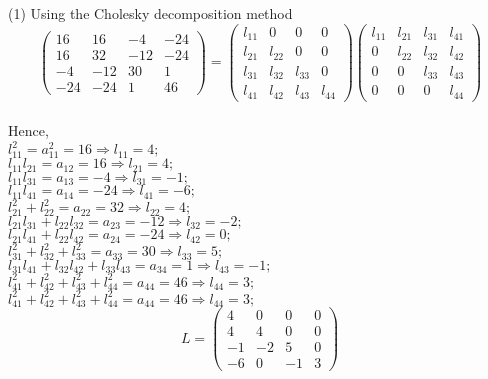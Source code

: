 \documentclass[a4paper, 12pt]{report}
\begin{document}
{      (1) Using the Cholesky decomposition method\\
      \begin{equation*}
      \begin{pmatrix}
      16 & 16 & -4 & -24\\
      16 & 32 & -12 & -24\\
      -4 & -12 & 30 & 1\\
      -24 & -24 & 1 & 46
      \end{pmatrix}
      =
     \begin{pmatrix}
     l_{11} & 0 & 0 & 0\\
     l_{21} & l_{22} & 0 & 0\\
     l_{31} & l_{32} & l_{33} & 0\\
     l_{41} & l_{42} & l_{43} & l_{44}
     \end{pmatrix}
     \begin{pmatrix}
     l_{11} & l_{21} & l_{31} & l_{41}\\
     0 & l_{22} & l_{32} & l_{42}\\
     0 & 0 & l_{33} & l_{43}\\
     0 & 0 & 0 & l_{44}
     \end{pmatrix}
     \end{equation*}\\
     Hence,\\
     
     $l^2_{11} = a^2_{11} = 16 \Rightarrow l_{11} = 4;$\\
     $l_{11}l_{21} = a_{12} = 16 \Rightarrow l_{21} = 4;$\\
     $l_{11}l_{31} = a_{13} = -4 \Rightarrow l_{31} = -1;$\\
     $l_{11}l_{41} = a_{14} = -24 \Rightarrow l_{41} = -6;$\\
     $l^2_{21} + l^2_{22} = a_{22} = 32 \Rightarrow l_{22} = 4;$\\
     $l_{21}l_{31} + l_{22}l_{32} = a_{23} = -12 \Rightarrow l_{32} = -2;$\\   
     $l_{21}l_{41} + l_{22}l_{42} = a_{24} = -24 \Rightarrow l_{42} = 0;$\\
     $l^2_{31} + l^2_{32} + l^2_{33} = a_{33} = 30 \Rightarrow l_{33} = 5;$\\
     $l_{31}l_{41} + l_{32}l_{42} + l_{33}l_{43} = a_{34} = 1 \Rightarrow l_{43} = -1;$
     $l^2_{41} + l^2_{42} + l^2_{43} + l^2_{44} = a_{44} = 46 \Rightarrow l_{44} = 3;$\\
     $l^2_{41} + l^2_{42} + l^2_{43} + l^2_{44} = a_{44} = 46 \Rightarrow l_{44} = 3;$\\
    \begin{equation*}L =
    \begin{pmatrix}
    4 & 0 & 0 & 0\\
    4 & 4 & 0 & 0\\
    -1 & -2 & 5 & 0\\
    -6 & 0 & -1 & 3
    \end{pmatrix}
    \end{equation*}\\
    
}
\end{document}
